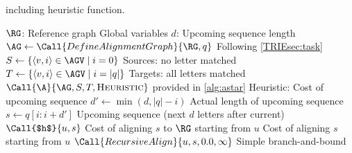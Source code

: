 \begin{algorithm}[t]
	\caption{\astarix including heuristic function.}\label{TRIEalg:astarix}
	\begin{algorithmic}[1]
		\State $\RG$: Reference graph \label{TRIElin:reference}
		\Comment Global variables
		\State $d$: Upcoming sequence length \label{TRIElin:d}
		\Statex
		 \label{TRIElin:astarix}
			\State $\AG \gets \Call{DefineAlignmentGraph}{\RG, q}$
			\Comment Following \cref{TRIEsec:task}
			\State $S \gets \{\langle v,i \rangle \in \AGV \mid i=0 \}$ \label{TRIElin:starts}
			\Comment Sources: no letter matched
			\State $T \gets \{\langle v,i \rangle \in \AGV \mid i=|q| \}$
			\Comment Targets: all letters matched
			\State \Return $\Call{\A}{\AG, S, T, \textsc{Heuristic}}$
			\Comment \A provided in \cref{alg:astar} \label{TRIElin:ret}
		\EndFunction
		\Statex
		 \label{TRIElin:heuristic-start}
		\Comment Heuristic: Cost of upcoming sequence
			\State $d' \gets \min(d, |q|-i)$
			\Comment Actual length of upcoming sequence
			\State $s \gets q[i:i+d']$ \label{TRIElin:s}
			\Comment Upcoming sequence (next $d$ letters after current)
			\State \Return $\Call{$h$}{u, s}$
			\label{TRIElin:align-upcoming}
			\Comment Cost of aligning $s$ to $\RG$ starting from $u$
		\EndFunction \label{TRIElin:heuristic-end}
		\Statex
		\Comment Cost of aligning $s$ starting from $u$
			\State \Return $\Call{RecursiveAlign}{u, s, 0.0, \infty}$
			\Comment Simple branch-and-bound \label{TRIElin:recursive-align}
		\EndFunction
	\end{algorithmic}
\end{algorithm}